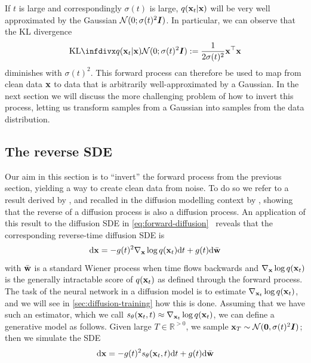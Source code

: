 If $t$ is large and correspondingly $\sigma(t)$ is large, $q({\mathbf{x}}_t|{\mathbf{x}})$ will be very well approximated by the Gaussian ${\mathcal{N}}(0; \sigma(t)^2{\bm{I}})$. In particular, we can observe that the KL divergence
\begin{equation}
    \kl{q(\rvx_t|\rvx)}{\gN(0; \sigma(t)^2\mI)} :=\frac{1}{2\sigma(t)^2} \rvx^\top \rvx
\end{equation}
diminishes with $\sigma(t)^2$. This forward process can therefore be used to map from clean data ${\mathbf{x}}$ to data that is arbitrarily well-approximated by a Gaussian. In the next section we will discuss the more challenging problem of how to invert this process, letting us transform samples from a Gaussian into samples from the data distribution.

\subsection{The reverse SDE} \label{sec:diffusion-reverse-sde}
Our aim in this section is to ``invert'' the forward process from the previous section, yielding a way to create clean data from noise. To do so we refer to a result  derived by \citet{anderson1982reverse}, and recalled in the diffusion modelling context by \citet{song2020score}, showing that the reverse of a diffusion process is also a diffusion process. An application of this result to the diffusion SDE in \cref{eq:forward-diffusion}~\citep{song2020score} reveals that the corresponding reverse-time diffusion SDE is
\begin{equation} \label{eq:reverse-diffusion}
    \mathrm{d}{\mathbf{x}} = -g(t)^2 \nabla_{\mathbf{x}} \log q({\mathbf{x}}_t) \mathrm{d}t + g(t) \mathrm{d}\bar{{\mathbf{w}}}
\end{equation}
with $\bar{{\mathbf{w}}}$ is a standard Wiener process when time flows backwards and $\nabla_{\mathbf{x}} \log q({\mathbf{x}}_t)$ is the generally intractable score of $q({\mathbf{x}}_t)$ as defined through the forward process. The task of the neural network in a diffusion model is to estimate $\nabla_{{\mathbf{x}}_t} \log q({\mathbf{x}}_t)$, and we will see in \cref{sec:diffusion-training} how this is done. Assuming that we have such an estimator, which we call $s_\theta({\mathbf{x}}_t, t) \approx \nabla_{{\mathbf{x}}_t} \log q({\mathbf{x}}_t)$, we can define a generative model as follows. Given large $T \in \mathbb{R}^{>0}$, we sample ${\mathbf{x}}_T \sim {\mathcal{N}}({\bm{0}}, \sigma(t)^2 {\bm{I}})$; then we simulate the SDE
\begin{equation} \label{eq:reverse-diffusion-with-nn}
    \mathrm{d}{\mathbf{x}} = -g(t)^2 s_\theta({\mathbf{x}}_t, t) \mathrm{d}t + g(t) \mathrm{d}\bar{{\mathbf{w}}}
\end{equation}
